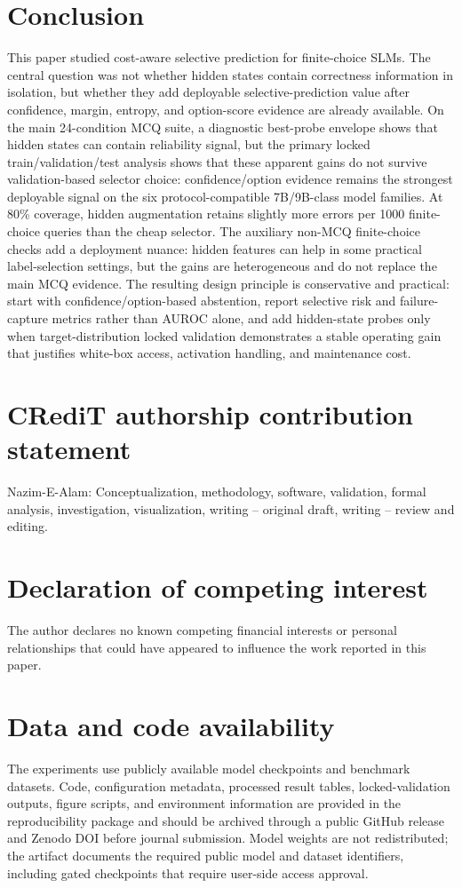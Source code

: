 \documentclass[preprint,12pt,authoryear]{elsarticle}
\begin{document}
\section{Conclusion}
This paper studied cost-aware selective prediction for finite-choice SLMs. The central question was not whether hidden states contain correctness information in isolation, but whether they add deployable selective-prediction value after confidence, margin, entropy, and option-score evidence are already available. On the main 24-condition MCQ suite, a diagnostic best-probe envelope shows that hidden states can contain reliability signal, but the primary locked train/validation/test analysis shows that these apparent gains do not survive validation-based selector choice: confidence/option evidence remains the strongest deployable signal on the six protocol-compatible 7B/9B-class model families. At 80\% coverage, hidden augmentation retains slightly more errors per 1000 finite-choice queries than the cheap selector. The auxiliary non-MCQ finite-choice checks add a deployment nuance: hidden features can help in some practical label-selection settings, but the gains are heterogeneous and do not replace the main MCQ evidence. The resulting design principle is conservative and practical: start with confidence/option-based abstention, report selective risk and failure-capture metrics rather than AUROC alone, and add hidden-state probes only when target-distribution locked validation demonstrates a stable operating gain that justifies white-box access, activation handling, and maintenance cost.

\section*{CRediT authorship contribution statement}
Nazim-E-Alam: Conceptualization, methodology, software, validation, formal analysis, investigation, visualization, writing -- original draft, writing -- review and editing.

\section*{Declaration of competing interest}
The author declares no known competing financial interests or personal relationships that could have appeared to influence the work reported in this paper.

\section*{Data and code availability}
The experiments use publicly available model checkpoints and benchmark datasets. Code, configuration metadata, processed result tables, locked-validation outputs, figure scripts, and environment information are provided in the reproducibility package and should be archived through a public GitHub release and Zenodo DOI before journal submission. Model weights are not redistributed; the artifact documents the required public model and dataset identifiers, including gated checkpoints that require user-side access approval.
\end{document}
